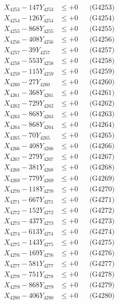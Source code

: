\documentclass[a4paper,10pt]{article}
\begin{document}
{\begin{align}
X_{4253} - 147Y_{4253} &\leq +0 && \text{(G4253)} \\
X_{4254} - 126Y_{4254} &\leq +0 && \text{(G4254)} \\
X_{4255} - 868Y_{4255} &\leq +0 && \text{(G4255)} \\
X_{4256} - 408Y_{4256} &\leq +0 && \text{(G4256)} \\
X_{4257} - 39Y_{4257} &\leq +0 && \text{(G4257)} \\
X_{4258} - 553Y_{4258} &\leq +0 && \text{(G4258)} \\
X_{4259} - 115Y_{4259} &\leq +0 && \text{(G4259)} \\
X_{4260} - 27Y_{4260} &\leq +0 && \text{(G4260)} \\
\allowbreak
X_{4261} - 368Y_{4261} &\leq +0 && \text{(G4261)} \\
X_{4262} - 729Y_{4262} &\leq +0 && \text{(G4262)} \\
X_{4263} - 868Y_{4263} &\leq +0 && \text{(G4263)} \\
X_{4264} - 868Y_{4264} &\leq +0 && \text{(G4264)} \\
X_{4265} - 70Y_{4265} &\leq +0 && \text{(G4265)} \\
X_{4266} - 408Y_{4266} &\leq +0 && \text{(G4266)} \\
X_{4267} - 279Y_{4267} &\leq +0 && \text{(G4267)} \\
X_{4268} - 381Y_{4268} &\leq +0 && \text{(G4268)} \\
X_{4269} - 779Y_{4269} &\leq +0 && \text{(G4269)} \\
X_{4270} - 118Y_{4270} &\leq +0 && \text{(G4270)} \\
\allowbreak
X_{4271} - 667Y_{4271} &\leq +0 && \text{(G4271)} \\
X_{4272} - 152Y_{4272} &\leq +0 && \text{(G4272)} \\
X_{4273} - 437Y_{4273} &\leq +0 && \text{(G4273)} \\
X_{4274} - 613Y_{4274} &\leq +0 && \text{(G4274)} \\
X_{4275} - 143Y_{4275} &\leq +0 && \text{(G4275)} \\
X_{4276} - 169Y_{4276} &\leq +0 && \text{(G4276)} \\
X_{4277} - 581Y_{4277} &\leq +0 && \text{(G4277)} \\
X_{4278} - 751Y_{4278} &\leq +0 && \text{(G4278)} \\
X_{4279} - 868Y_{4279} &\leq +0 && \text{(G4279)} \\
X_{4280} - 406Y_{4280} &\leq +0 && \text{(G4280)} \\

\end{align}}
\end{document}

